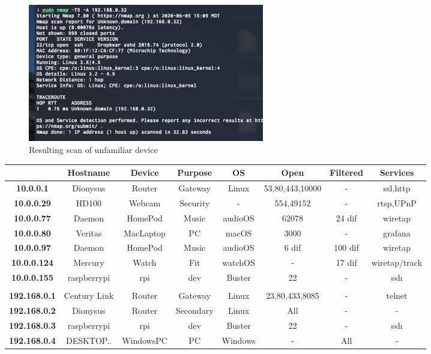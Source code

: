 \documentclass[10pt]{article}
\begin{document}
\begin{figure}[H]
\centering
\includegraphics[width=0.5\textwidth]{unknown.png}
\caption{Resulting scan of unfamiliar device}\label{unknown image}
\end{figure}

\begin{table}[H]
  \begin{center}
  \begin{tabular}{ | c | c | c | c | c | c | c | c | } 
  \hline
   & \textbf{Hostname} & \textbf{Device} & \textbf{Purpose} & \textbf{OS} & \textbf{Open} & \textbf{Filtered}  & \textbf{Services}  \\  
   \hline
   \textbf{10.0.0.1} & Dionysus & Router & Gateway & Linux & 53,80,443,10000 & - & ssl,http \\  
   \hline
   \textbf{10.0.0.29}  & HD100 & Webcam & Security & - & 554,49152 & - & rtsp,UPnP \\  
   \hline
   \textbf{10.0.0.77}  & Daemon & HomePod & Music & audioOS & 62078 & 24 dif & wiretap\\  
   \hline
   \textbf{10.0.0.80}  & Veritas & MacLaptop & PC & macOS & 3000 & - & grafana \\  
   \hline
   \textbf{10.0.0.97}  & Daemon & HomePod & Music & audioOS & 6 dif & 100 dif & wiretap \\  
   \hline
   \textbf{10.0.0.124}  & Mercury & Watch & Fit & watchOS & - & 17 dif & wiretap/track \\  
   \hline
   \textbf{10.0.0.155}  & raspberrypi & rpi & dev & Buster & 22 & - & ssh \\  
   \hline
   \textbf{}  &  &  &   &  &  &  & \\  
   \hline
   \textbf{192.168.0.1}  & Century Link & Router & Gateway & Linux & 23,80,433,8085 & - & telnet\\  
   \hline
   \textbf{192.168.0.2}  & Dionysus & Router & Secondary & Linux & All & - & - \\  
   \hline
   \textbf{192.168.0.3}  & raspberrypi & rpi & dev & Buster & 22 & - & ssh \\  
   \hline
   \textbf{192.168.0.4}  & DESKTOP.. & WindowsPC & PC & Windows & - & All & - \\  

\end{tabular}
\end{center}
\end{table}
\end{document}

